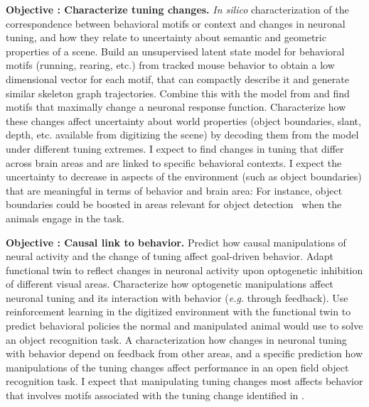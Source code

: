 \documentclass[COG,11pt]{ercgrant}
\begin{document}
\textbf{Objective : Characterize tuning changes.}  \textit{In silico} characterization of the correspondence between behavioral motifs or context and changes in neuronal tuning, and how they relate to uncertainty about semantic and geometric properties of a scene.  Build an unsupervised latent state model for behavioral motifs (running, rearing, etc.) from tracked mouse behavior to obtain a low dimensional vector for each motif, that can compactly describe it and generate similar skeleton graph trajectories. Combine this with the model from  and find motifs that maximally change a neuronal response function. Characterize how these changes affect uncertainty about world properties (object boundaries, slant, depth, etc. available from digitizing the scene) by decoding them from the model under different tuning extremes.  I expect to find changes in tuning that differ across brain areas and are linked to specific behavioral contexts. 
I expect the uncertainty to decrease in aspects of the environment (such as object boundaries) that are meaningful in terms of behavior and brain area: For instance, object boundaries could be boosted in areas relevant for object detection~\parencite{Froudarakis2019-yt} when the animals engage in the task.

\textbf{Objective : Causal link to behavior.}  Predict how causal manipulations of neural activity and the change of tuning affect goal-driven behavior.  Adapt functional twin to reflect changes in neuronal activity upon optogenetic inhibition of different visual areas. Characterize how optogenetic manipulations affect neuronal tuning and its interaction with behavior (\textit{e.g.} through feedback). Use reinforcement learning in the digitized environment with the functional twin to predict behavioral policies the normal and manipulated animal would use to solve  an object recognition task.  A characterization how changes in neuronal tuning with behavior depend on feedback from other areas, and a specific prediction how manipulations of the tuning changes affect performance in an open field object recognition task. 
I expect that manipulating tuning changes most affects behavior that involves motifs associated with the tuning change identified in . 
\end{document}
